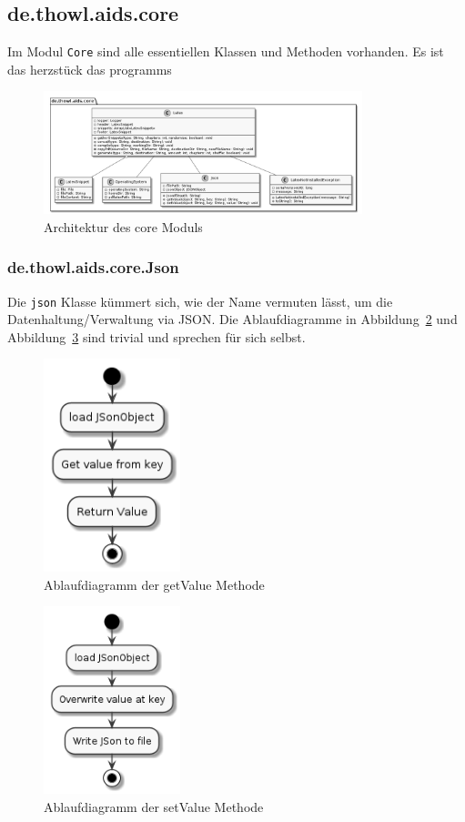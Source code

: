 \documentclass[stu, a4paper, 11pt, floatsintext]{apa7}
\begin{document}
\subsection{de.thowl.aids.core}
\noindent Im Modul \texttt{Core} sind alle essentiellen Klassen und Methoden vorhanden. Es ist das herzstück das programms

\begin{figure}[!htbp]
\centering
\includegraphics[width=350px]{../technical_documentation/diagramm/uml/flowcharts/core/core.png}
\caption{\label{Core Architektur}Architektur des core Moduls}
\end{figure}

\subsubsection{de.thowl.aids.core.Json}
\noindent Die \texttt{json} Klasse kümmert sich, wie der Name vermuten lässt, um die Datenhaltung/Verwaltung via JSON.
Die Ablaufdiagramme in Abbildung~\ref{getValue-methode} und Abbildung~\ref{setValue-methode} sind trivial und sprechen für sich selbst.

\begin{figure}[!htbp]
\centering
\includegraphics[width=150px]{../technical_documentation/diagramm/uml/flowcharts/core/json/getValue.png}
\caption{\label{getValue-methode}Ablaufdiagramm der getValue Methode}
\end{figure}

\begin{figure}[!htbp]
\centering
\includegraphics[width=150px]{../technical_documentation/diagramm/uml/flowcharts/core/json/setValue.png}
\caption{\label{setValue-methode}Ablaufdiagramm der setValue Methode}
\end{figure}
\end{document}

